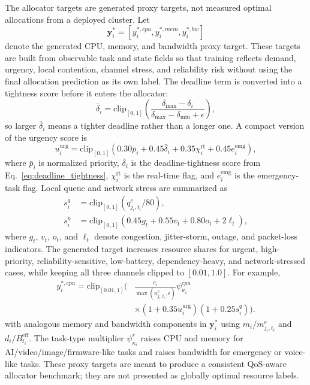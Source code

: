The allocator targets are generated proxy targets, not measured optimal allocations from a deployed cluster. Let
\begin{equation}
\mathbf{y}_i^{*}=
\left[y_i^{*,cpu},y_i^{*,mem},y_i^{*,bw}\right]
\label{eq:allocator_target_vector}
\end{equation}
denote the generated CPU, memory, and bandwidth proxy target. These targets are built from observable task and state fields so that training reflects demand, urgency, local contention, channel stress, and reliability risk without using the final allocation prediction as its own label. The deadline term is converted into a tightness score before it enters the allocator:
\begin{equation}
\bar{\delta}_i=
\mathrm{clip}_{[0,1]}\left(
\frac{\delta_{\max}-\delta_i}{\delta_{\max}-\delta_{\min}+\epsilon}
\right),
\label{eq:deadline_tightness}
\end{equation}
so larger $\bar{\delta}_i$ means a tighter deadline rather than a longer one. A compact version of the urgency score is
\begin{equation}
u_i^{\mathrm{urg}}=\mathrm{clip}_{[0,1]}
\left(0.30\bar{p}_i+0.45\bar{\delta}_i+0.35\chi_i^{\mathrm{rt}}+0.45e_i^{\mathrm{emg}}\right),
\label{eq:allocator_urgency}
\end{equation}
where $\bar{p}_i$ is normalized priority, $\bar{\delta}_i$ is the deadline-tightness score from Eq.~\eqref{eq:deadline_tightness}, $\chi_i^{\mathrm{rt}}$ is the real-time flag, and $e_i^{\mathrm{emg}}$ is the emergency-task flag. Local queue and network stress are summarized as
\begin{align}
s^q_i &= \mathrm{clip}_{[0,1]}\left(q^e_{j_i,t_i}/80\right),\\
s^n_i &= \mathrm{clip}_{[0,1]}\left(0.45g_t+0.55v_t+0.80o_t+2\ell_t\right),
\label{eq:allocator_stress}
\end{align}
where $g_t$, $v_t$, $o_t$, and $\ell_t$ denote congestion, jitter-storm, outage, and packet-loss indicators. The generated target increases resource shares for urgent, high-priority, reliability-sensitive, low-battery, dependency-heavy, and network-stressed cases, while keeping all three channels clipped to $[0.01,1.0]$. For example,
\begin{equation}
\begin{aligned}
y^{*,cpu}_i
=\mathrm{clip}_{[0.01,1]}\Bigg(
&\frac{c_i}{\max(u^e_{j_i,t_i},\epsilon)}
\psi^{cpu}_{\kappa_i} \\
&\times(1+0.35u_i^{\mathrm{urg}})
(1+0.25s^q_i)
\Bigg).
\end{aligned}
\label{eq:allocator_cpu_target}
\end{equation}
with analogous memory and bandwidth components in $\mathbf{y}_i^{*}$ using $m_i/m^e_{j_i,t_i}$ and $d_i/B^{\mathrm{eff}}_{t_i}$. The task-type multiplier $\psi^r_{\kappa_i}$ raises CPU and memory for AI/video/image/firmware-like tasks and raises bandwidth for emergency or voice-like tasks. These proxy targets are meant to produce a consistent QoS-aware allocator benchmark; they are not presented as globally optimal resource labels.

